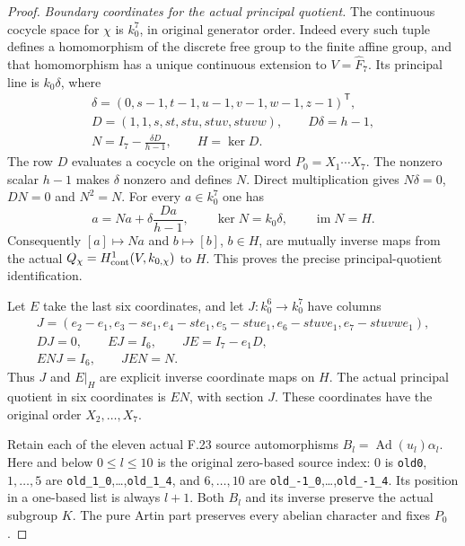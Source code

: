 \begin{proof}
\emph{Boundary coordinates for the actual principal quotient.}
The continuous cocycle space for $\chi$
is $k_0^7$, in original generator order.
Indeed every such tuple defines a
homomorphism of the discrete free group
to the finite affine group, and that
homomorphism has a unique continuous
extension to $V=\widehat F_7$.
Its principal line is $k_0\delta$, where
\[
 \begin{gathered}
 \delta=(0,s-1,t-1,u-1,v-1,w-1,z-1)^{\mathsf T},\\
 D=(1,1,s,st,stu,stuv,stuvw),\qquad
                            D\delta=h-1,\\
 N=I_7-\frac{\delta D}{h-1},\qquad H=\ker D.
 \end{gathered}                                                \tag{F.32.6}
\]
The row $D$ evaluates a cocycle on
the original word $P_0=X_1\cdots X_7$.
The nonzero scalar $h-1$ makes
$\delta$ nonzero and defines $N$.
Direct multiplication gives
$N\delta=0$, $DN=0$ and $N^2=N$.
For every $a\in k_0^7$ one has
\[
       a=Na+\delta\frac{Da}{h-1},\qquad
       \ker N=k_0\delta,\qquad \operatorname{im}N=H.
                                                               \tag{F.32.7}
\]
Consequently $[a]\mapsto Na$ and
$b\mapsto[b]$, $b\in H$, are mutually
inverse maps from the actual
$Q_\chi=H^1_{\rm cont}(V,k_{0,\chi})$
to $H$. This proves the precise
principal-quotient identification.

Let $E$ take the last six coordinates,
and let $J:k_0^6\to k_0^7$ have columns
\[
 \begin{gathered}
 J=(e_2-e_1,e_3-se_1,e_4-ste_1,
                         e_5-stue_1,e_6-stuve_1,e_7-stuvwe_1),\\
 DJ=0,\qquad EJ=I_6,\qquad JE=I_7-e_1D,\\
 ENJ=I_6,\qquad JEN=N.
 \end{gathered}                                                \tag{F.32.8}
\]
Thus $J$ and $E|_H$ are explicit
inverse coordinate maps on $H$.
The actual principal quotient in six
coordinates is $EN$, with section $J$.
These coordinates have the original
order $X_2,\ldots,X_7$.

Retain each of the eleven actual
F.23 source automorphisms
$B_l=\operatorname{Ad}(u_l)\alpha_l$.
Here and below $0\leq l\leq10$ is
the original zero-based source index:
$0$ is \texttt{old0}, $1,\ldots,5$
are \texttt{old\_1\_0},\ldots,\texttt{old\_1\_4},
and $6,\ldots,10$ are
\texttt{old\_-1\_0},\ldots,\texttt{old\_-1\_4}.
Its position in a one-based list is
always $l+1$.
Both $B_l$ and its inverse preserve
the actual subgroup $K$.
The pure Artin part preserves every
abelian character and fixes $P_0$.


\end{proof}
